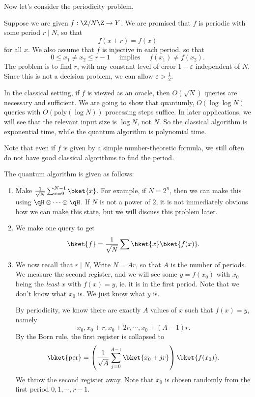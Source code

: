 \documentclass[a4paper]{article}
\begin{document}
Now let's consider the periodicity problem.
\begin{eg}
  Suppose we are given $f: \Z/N\Z \to Y$. We are promised that $f$ is periodic with some period $r \mid N$, so that
  \[
    f(x + r) = f(x)
  \]
  for all $x$. We also assume that $f$ is injective in each period, so that
  \[
    0 \leq x_1 \not= x_2 \leq r - 1\quad\text{ implies }\quad f(x_1) \not= f(x_2).
  \]
  The problem is to find $r$, with any constant level of error $1 - \varepsilon$ independent of $N$. Since this is not a decision problem, we can allow $\varepsilon > \frac{1}{2}$.

  In the classical setting, if $f$ is viewed as an oracle, then $O(\sqrt{N})$ queries are necessary and sufficient. We are going to show that quantumly, $O(\log \log N)$ queries with $O(\mathrm{poly}(\log N))$ processing steps suffice. In later applications, we will see that the relevant input size is $\log N$, not $N$. So the classical algorithm is exponential time, while the quantum algorithm is polynomial time.

  Note that even if $f$ is given by a simple number-theoretic formula, we still often do not have good classical algorithms to find the period.

  The quantum algorithm is given as follows:
  \begin{enumerate}
    \item Make $\frac{1}{\sqrt{N}} \sum_{x = 0}^{N - 1} \bket{x}$. For example, if $N = 2^n$, then we can make this using $\qH \otimes \cdots \otimes \qH$. If $N$ is not a power of $2$, it is not immediately obvious how we can make this state, but we will discuss this problem later.

    \item We make one query to get
      \[
        \bket{f} = \frac{1}{\sqrt{N}} \sum \bket{x} \bket{f(x)}.
      \]

    \item We now recall that $r \mid N$, Write $N = Ar$, so that $A$ is the number of periods. We measure the second register, and we will see some $y = f(x_0)$ with $x_0$ being the \emph{least} $x$ with $f(x) = y$, ie. it is in the first period. Note that we don't know what $x_0$ is. We just know what $y$ is.

      By periodicity, we know there are exactly $A$ values of $x$ such that $f(x) = y$, namely
      \[
        x_0, x_0 + r, x_0 + 2r, \cdots, x_0 + (A - 1)r.
      \]
      By the Born rule, the first register is collapsed to
      \[
        \bket{\mathrm{per}} = \left(\frac{1}{\sqrt{A}} \sum_{j = 0}^{A - 1} \bket{x_0 + jr}\right) \bket{f(x_0)}.
      \]
      We throw the second register away. Note that $x_0$ is chosen randomly from the first period $0, 1, \cdots, r - 1$.


\end{enumerate}
\end{eg}
\end{document}
